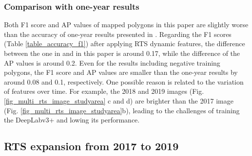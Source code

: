 \documentclass[authoryear,preprint,review,12pt]{elsarticle}
\begin{document}

\subsubsection{Comparison with one-year results}
\label{sec_compare_with_201805_results}

Both F1 score and AP values of mapped polygons in this paper are slightly worse than the accuracy of one-year results presented in \cite{huang2020using}. 
Regarding the F1 scores (Table \ref{table_accuracy_f1}) after applying RTS dynamic features, the difference between the one in \cite{huang2020using} and in this paper is around 0.17, while the difference of the AP values is around 0.2.
Even for the results including negative training polygons, the F1 score and AP values are smaller than the one-year results by around 0.08 and 0.1, respectively. 
One possible reason is related to the variation of features over time. 
For example, the 2018 and 2019 images (Fig. \ref{fig_multi_rts_image_studyarea} c and d) are brighter than the 2017 image (Fig. \ref{fig_multi_rts_image_studyarea}b), leading to the challenges of training the DeepLabv3+ and lowing its performance. %



\subsection{RTS expansion from 2017 to 2019}
\label{sec_rts_expanding}
\end{document}
